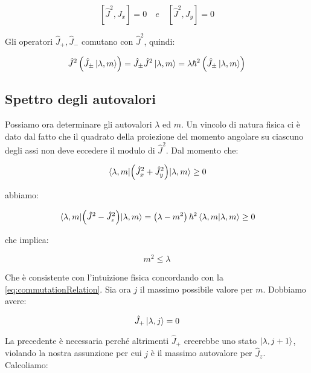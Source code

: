 	\begin{equation}
		\left [ \hat{J}^2, J_x \right ] = 0 \quad e \quad \left [ \hat{J}^2, J_y \right ] = 0
	\end{equation}

Gli operatori $\hat{J}_+, \hat{J}_-$ comutano con $\hat{J}^2$, quindi:

	\begin{equation}
		\hat{J}^2 \left ( \hat{J}_\pm \ket{\lambda, m} \right ) = \hat{J}_\pm \hat{J}^2 \ket{\lambda, m} = \lambda \hbar^2 \left (
			\hat{J}_\pm \ket{\lambda, m} \right )
	\end{equation}

\subsection{Spettro degli autovalori}

Possiamo ora determinare gli autovalori $\lambda$ ed $m$. Un vincolo di natura fisica ci \`e dato dal fatto che il quadrato della proiezione del momento angolare su ciascuno degli assi non deve eccedere il modulo di $\hat{J}^2$. Dal momento che:

	\begin{equation}
		\mel{\lambda, m}{\left ( \hat{J}^2_x + \hat{J}^2_y \right )}{\lambda, m} \ge 0
	\end{equation}

abbiamo:

	\begin{equation}
		\mel{\lambda, m}{\left ( \hat{J}^2 - \hat{J}^2_z \right )}{\lambda, m} = \left ( \lambda - m^2 \right ) \hbar^2 \braket{\lambda, m}{\lambda, m} \ge 0
	\end{equation}

che implica:

	\begin{equation}
		m^2 \le \lambda
	\end{equation}

Che \`e consistente con l'intuizione fisica concordando con la \eqref{eq:commutationRelation}. Sia ora $j$ il massimo possibile valore per $m$. Dobbiamo avere:

	\begin{equation}
		\hat{J}_+ \ket{\lambda, j} = 0
	\end{equation}

La precedente \`e necessaria perch\'e altrimenti $\hat{J}_+$ creerebbe uno stato $\ket{\lambda, j+1}$, violando la nostra assunzione per cui $j$ \`e il massimo autovalore per $\hat{J}_z$. Calcoliamo:

